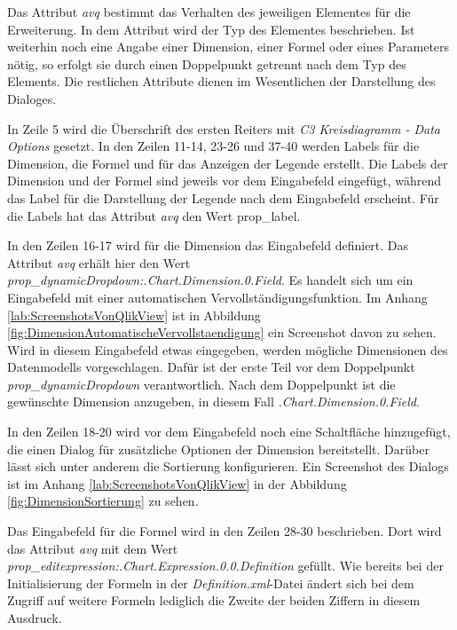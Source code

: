 Das Attribut \textit{avq} bestimmt das Verhalten des jeweiligen Elementes für die Erweiterung. In dem Attribut wird der Typ des Elementes beschrieben. Ist weiterhin noch eine Angabe einer Dimension, einer Formel oder eines Parameters nötig, so erfolgt sie durch einen Doppelpunkt getrennt nach dem Typ des Elements. Die restlichen Attribute dienen im Wesentlichen der Darstellung des Dialoges.

In Zeile 5 wird die Überschrift des ersten Reiters mit \textit{C3 Kreisdiagramm - Data Options} gesetzt. In den Zeilen 11-14, 23-26 und 37-40 werden Labels für die Dimension, die Formel und für das Anzeigen der Legende erstellt. Die Labels der Dimension und der Formel sind jeweils vor dem Eingabefeld eingefügt, während das Label für die Darstellung der Legende nach dem Eingabefeld erscheint. Für die Labels hat das Attribut \textit{avq} den Wert prop\_label. 

In den Zeilen 16-17 wird für die Dimension das Eingabefeld definiert. Das Attribut \textit{avq} erhält hier den Wert \textit{prop\_dynamicDropdown:.Chart.Dimension.0.Field}. Es handelt sich um ein Eingabefeld mit einer automatischen Vervollständigungsfunktion. Im Anhang \ref{lab:ScreenshotsVonQlikView} ist in Abbildung \ref{fig:DimensionAutomatischeVervollstaendigung} ein Screenshot davon zu sehen. Wird in diesem Eingabefeld etwas eingegeben, werden mögliche Dimensionen des Daten\-modells vorgeschlagen. Dafür ist der erste Teil vor dem Doppelpunkt \textit{prop\_dynamicDropdown} verantwortlich. Nach dem Doppelpunkt ist die gewünschte Dimension anzugeben, in diesem Fall \textit{.Chart.Dimension.0.Field}.

In den Zeilen 18-20 wird vor dem Eingabefeld noch eine Schaltfläche hinzugefügt, die einen Dialog für zusätzliche Optionen der Dimension bereitstellt. Darüber lässt sich unter anderem die Sortierung konfigurieren. Ein Screenshot des Dialogs ist im Anhang \ref{lab:ScreenshotsVonQlikView} in der Abbildung \ref{fig:DimensionSortierung} zu sehen. 

Das Eingabefeld für die Formel wird in den Zeilen 28-30 beschrieben. Dort wird das Attribut \textit{avq} mit dem Wert \textit{prop\_editexpression:.Chart.Expression.0.0.Definition} gefüllt. Wie bereits bei der Initialisierung der Formeln in der \textit{Definition.xml}-Datei ändert sich bei dem Zugriff auf weitere Formeln lediglich die Zweite der beiden Ziffern in diesem Ausdruck.

